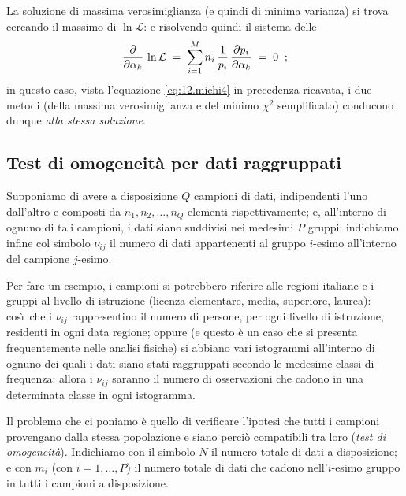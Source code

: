 La soluzione di massima verosimiglianza (e quindi di minima
varianza) si trova cercando il massimo di $\ln \mathcal{L}$:
e risolvendo quindi il sistema delle
\begin{equation*}
  \frac{\partial}{\partial \alpha_k} \, \ln \mathcal{L}
    \; = \; \sum_{i=1}^M n_i \, \frac{1}{p_i} \,
    \frac{\partial p_i}{\partial \alpha_k} \; = \; 0 \;\; ;
\end{equation*}
in questo caso, vista l'equazione \eqref{eq:12.michi4} in
precedenza ricavata, i due metodi (della massima
verosimiglianza e del minimo $\chi^2$ semplificato)
conducono dunque \emph{alla stessa soluzione}.%
%

\subsection{Test di omogeneit\`a per dati raggruppati}%
%
Supponiamo di avere a disposizione $Q$ campioni di dati,
indipendenti l'uno dall'altro e composti da $n_1,
n_2,\ldots, n_Q$ elementi rispettivamente; e, all'interno di
ognuno di tali campioni, i dati siano suddivisi nei medesimi
$P$ gruppi: indichiamo infine col simbolo $\nu_{ij}$ il
numero di dati appartenenti al gruppo $i$-esimo all'interno
del campione $j$-esimo.

Per fare un esempio, i campioni si potrebbero riferire alle
regioni italiane e i gruppi al livello di istruzione
(licenza elementare, media, superiore, laurea): cos\`\i\ che
i $\nu_{ij}$ rappresentino il numero di persone, per ogni
livello di istruzione, residenti in ogni data regione;
oppure (e questo \`e un caso che si presenta frequentemente
nelle analisi fisiche) si abbiano vari istogrammi
all'interno di ognuno dei quali i dati siano stati
raggruppati secondo le medesime classi di frequenza:%
 allora i $\nu_{ij}$ saranno il
numero di osservazioni che cadono in una determinata classe
in ogni istogramma.

Il problema che ci poniamo \`e quello di verificare
l'ipotesi che tutti i campioni provengano dalla stessa
popolazione e siano perci\`o compatibili tra loro
(\emph{test di omogeneit\`a}).  Indichiamo con il simbolo
$N$ il numero totale di dati a disposizione; e con $m_i$
(con $i=1,\ldots,P$) il numero totale di dati che cadono
nell'$i$-esimo gruppo in tutti i campioni a disposizione.


